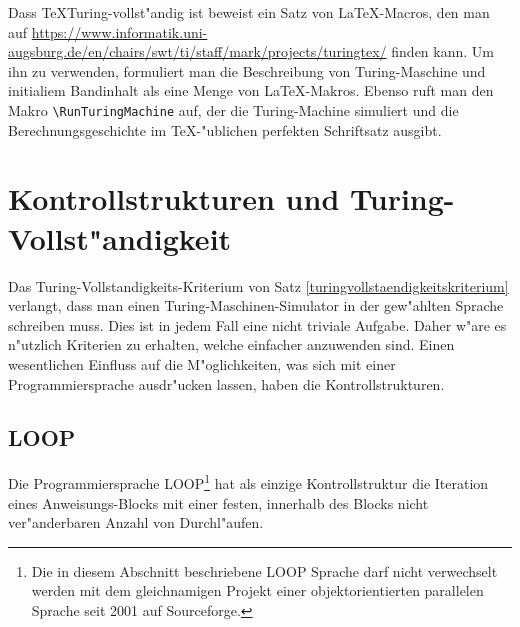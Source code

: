 Dass \TeX Turing-vollst"andig ist beweist ein Satz von \LaTeX-Macros, den
man auf
\url{https://www.informatik.uni-augsburg.de/en/chairs/swt/ti/staff/mark/projects/turingtex/}
finden kann.
Um ihn zu verwenden, formuliert man die Beschreibung
von Turing-Maschine und initialiem Bandinhalt als eine Menge von
\LaTeX-Makros. Ebenso ruft man den Makro \verb+\RunTuringMachine+ auf,
der die Turing-Machine simuliert und die Berechnungsgeschichte im
\TeX-"ublichen perfekten Schriftsatz ausgibt.



\section{Kontrollstrukturen und Turing-Vollst"andigkeit}
Das Turing-Vollstandigkeits-Kriterium von Satz
\ref{turingvollstaendigkeitskriterium} verlangt, dass man einen
Turing-Maschinen-Simulator in der gew"ahlten Sprache schreiben muss.
Dies ist in jedem Fall eine nicht triviale Aufgabe.
Daher w"are es n"utzlich Kriterien zu erhalten, welche einfacher
anzuwenden sind. Einen wesentlichen Einfluss auf die M"oglichkeiten,
was sich mit einer Programmiersprache ausdr"ucken lassen, haben die
Kontrollstrukturen.

\newcommand{\assignment}{\mathbin{\texttt{:=}}}

\subsection{LOOP}
Die Programmiersprache
LOOP\footnote{Die in diesem Abschnitt beschriebene
LOOP Sprache darf nicht verwechselt werden mit dem gleichnamigen
Projekt einer objektorientierten parallelen Sprache seit
2001 auf Sourceforge.}
hat als einzige Kontrollstruktur die
Iteration eines Anweisungs-Blocks mit einer festen, innerhalb des
Blocks nicht ver"anderbaren Anzahl von Durchl"aufen.

